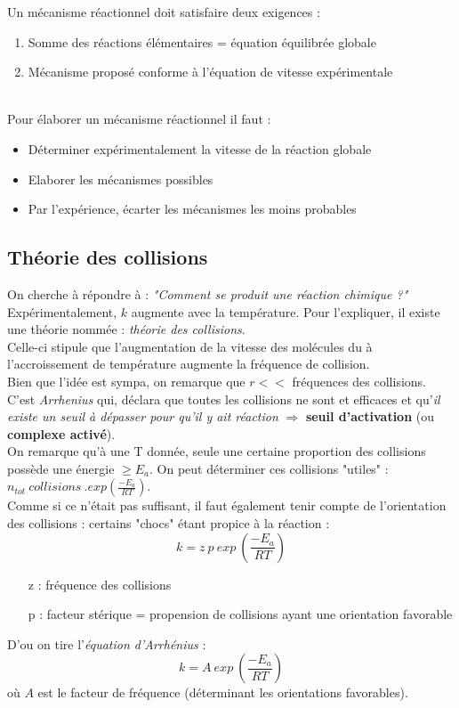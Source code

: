 \documentclass[12pt, a4paper]{article}
\begin{document}
Un mécanisme réactionnel doit satisfaire deux exigences :
\begin{enumerate}
\item Somme des réactions élémentaires = équation équilibrée globale
\item Mécanisme proposé conforme à l'équation de vitesse expérimentale
\end{enumerate}\ \\
Pour élaborer un mécanisme réactionnel il faut :
\begin{itemize}
\item Déterminer expérimentalement la vitesse de la réaction globale
\item Elaborer les mécanismes possibles
\item Par l'expérience, écarter les mécanismes les moins probables
\end{itemize}


\subsection{Théorie des collisions}
On cherche à répondre à : \textit{"Comment se produit une réaction chimique ?"}\\
Expérimentalement, $k$ augmente avec la température. Pour l'expliquer, il existe une théorie nommée : \textit{théorie des collisions}.\\

Celle-ci stipule que l'augmentation de la vitesse des molécules du à l'accroissement de température augmente la fréquence de collision.\\

Bien que l'idée est sympa, on remarque que $r <<$ fréquences des collisions. C'est \textit{Arrhenius} qui, déclara que toutes les collisions ne sont et efficaces et qu'\textit{il existe un seuil à dépasser pour qu'il y ait réaction} $\Rightarrow$ \textbf{seuil d'activation} (ou \textbf{complexe activé}).\\

On remarque qu'à une T donnée, seule une certaine proportion des collisions possède une énergie $\geq E_a$. On peut déterminer ces collisions "utiles" : $n_{tot}\ collisions\ . exp(\frac{-E_a}{RT})$.\\

Comme si ce n'était pas suffisant, il faut également tenir compte de l'orientation des collisions : certains "chocs" étant propice à la réaction :
$$k = z\ p\ exp\ (\frac{-E_a}{RT})$$
\begin{itemize}
\item[z] : fréquence des collisions
\item[p] : facteur stérique = propension de collisions ayant une orientation favorable
\end{itemize}
D'ou on tire l'\textit{équation d'Arrhénius} :
$$k = A\ exp\ (\frac{-E_a}{RT})$$
où $A$ est le facteur de fréquence (déterminant les orientations favorables).
\end{document}
